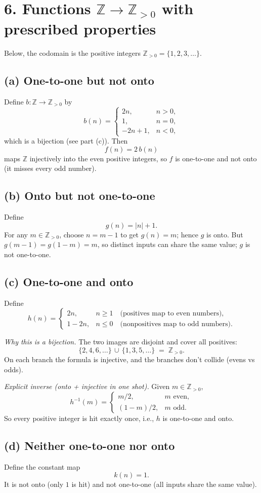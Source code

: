 \section*{6. Functions $\mathbb{Z}\to\mathbb{Z}_{>0}$ with prescribed properties}

Below, the codomain is the positive integers $\mathbb{Z}_{>0}=\{1,2,3,\dots\}$.

\subsection*{(a) One-to-one but not onto}
Define $b:\mathbb{Z}\to\mathbb{Z}_{>0}$ by
\[
b(n)=\begin{cases}
2n, & n>0,\\
1,  & n=0,\\
-2n+1, & n<0,
\end{cases}
\]
which is a bijection (see part (c)). Then
\[
f(n)=2\,b(n)
\]
maps $\mathbb{Z}$ injectively into the even positive integers, so $f$ is one-to-one and not onto
(it misses every odd number).

\subsection*{(b) Onto but not one-to-one}
Define
\[
g(n)=|n|+1.
\]
For any $m\in\mathbb{Z}_{>0}$, choose $n=m-1$ to get $g(n)=m$; hence $g$ is onto.
But $g(m-1)=g(1-m)=m$, so distinct inputs can share the same value; $g$ is not one-to-one.

\subsection*{(c) One-to-one and onto}
Define
\[
h(n)=
\begin{cases}
2n, & n\ge 1 \quad\text{(positives map to even numbers)} ,\\[2pt]
1-2n, & n\le 0 \quad\text{(nonpositives map to odd numbers)} .
\end{cases}
\]

\noindent\emph{Why this is a bijection.}
The two images are disjoint and cover all positives:
\[
\{2,4,6,\dots\} \,\cup\, \{1,3,5,\dots\} \;=\; \mathbb{Z}_{>0}.
\]
On each branch the formula is injective, and the branches don’t collide (evens vs odds).

\noindent\emph{Explicit inverse (onto + injective in one shot).}
Given $m\in\mathbb{Z}_{>0}$,
\[
h^{-1}(m)=
\begin{cases}
m/2, & \text{$m$ even},\\[2pt]
(1-m)/2, & \text{$m$ odd}.
\end{cases}
\]
So every positive integer is hit exactly once, i.e., $h$ is one-to-one and onto.

\subsection*{(d) Neither one-to-one nor onto}
Define the constant map
\[
k(n)=1.
\]
It is not onto (only $1$ is hit) and not one-to-one (all inputs share the same value).
